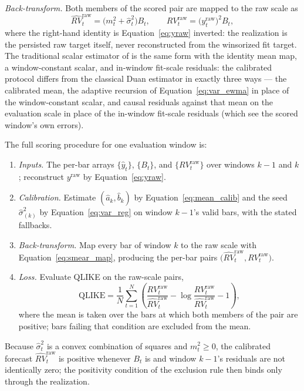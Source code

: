 \emph{Back-transform.} Both members of the scored pair are mapped to the
raw scale as
\begin{equation}
    \widehat{RV}_t^{\mathrm{raw}}
    = \bigl(m_t^2 + \hat{\sigma}^2_t\bigr) B_t,
    \qquad
    RV_t^{\mathrm{raw}} = \bigl(y^{\mathrm{raw}}_t\bigr)^2 B_t,
    \label{eq:smear_map}
\end{equation}
where the right-hand identity is Equation~\eqref{eq:yraw} inverted: the
realization is the persisted raw target itself, never reconstructed from
the winsorized fit target. The traditional scalar estimator of
\citet{Duan1983} is the same form with the identity mean map, a
window-constant scalar, and in-window fit-scale residuals: the calibrated protocol
differs from the classical Duan estimator in exactly three ways --- the calibrated
mean, the adaptive recursion of Equation~\eqref{eq:var_ewma} in place
of the window-constant scalar, and causal residuals against that mean
on the evaluation scale in place of the in-window fit-scale residuals
(which see the scored window's own errors).

The full scoring procedure for one evaluation window is:
\begin{enumerate}
    \item \emph{Inputs.} The per-bar arrays $\{\hat{y}_t\}$, $\{B_t\}$,
    and $\{RV^{\mathrm{raw}}_t\}$ over windows $k-1$ and $k$; reconstruct
    $y^{\mathrm{raw}}$ by Equation~\eqref{eq:yraw}.
    \item \emph{Calibration.} Estimate $(\hat{a}_k, \hat{b}_k)$ by
    Equation~\eqref{eq:mean_calib} and the seed $\hat{\sigma}^2_{(k)}$ by
    Equation~\eqref{eq:var_reg} on window $k-1$'s valid bars, with the
    stated fallbacks.
    \item \emph{Back-transform.} Map every bar of window $k$ to the raw
    scale with Equation~\eqref{eq:smear_map}, producing the per-bar pairs
    $\bigl(\widehat{RV}_t^{\mathrm{raw}}, RV_t^{\mathrm{raw}}\bigr)$.
    \item \emph{Loss.} Evaluate QLIKE on the raw-scale pairs,
    \begin{equation}
        \mathrm{QLIKE}
        = \frac{1}{N}\sum_{t=1}^{N}
          \left(
            \frac{RV_t^{\mathrm{raw}}}{\widehat{RV}_t^{\mathrm{raw}}}
            - \log\frac{RV_t^{\mathrm{raw}}}{\widehat{RV}_t^{\mathrm{raw}}}
            - 1
          \right),
        \label{eq:qlike_raw}
    \end{equation}
    where the mean is taken over the bars at which both members of the pair
    are positive; bars failing that condition are excluded from the mean.
\end{enumerate}
Because $\hat{\sigma}^2_t$ is a convex combination of squares and
$m_t^2 \ge 0$, the
calibrated forecast $\widehat{RV}_t^{\mathrm{raw}}$ is positive whenever
$B_t$ is and window $k-1$'s residuals are not identically zero; the
positivity condition of the exclusion rule then binds only through the
realization.

